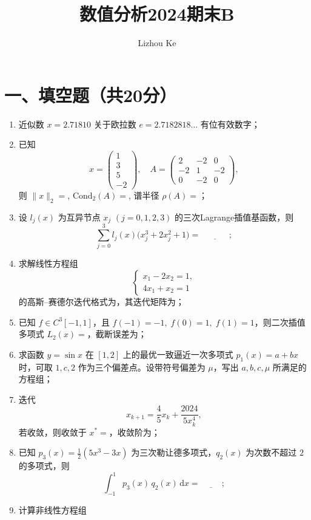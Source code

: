 \documentclass[12pt,a4paper]{article}
\title{数值分析2024期末B}
\author{Lizhou Ke}
\date{}
\newcommand{\blank}[1]{\underline{\hspace{#1}}}
\newcommand{\norm}[1]{\lVert#1\rVert_2}
\begin{document}
	
	\maketitle
	
	\section*{一、填空题（共20分）}
	\begin{enumerate}[leftmargin=*,itemsep=1.5ex]
		\item 近似数 $x=2.71810$ 关于欧拉数 $e=2.7182818\ldots$ 有\blank{20pt}位有效数字；
		\item 已知 
		\[
		x=\begin{pmatrix}1\\3\\5\\-2\end{pmatrix},\quad
		A=\begin{pmatrix}2&-2&0\\-2&1&-2\\0&-2&0\end{pmatrix},
		\]
		则 $\norm{x}=$\blank{20pt}, $\mathrm{Cond}_2(A)=$\blank{20pt}, 谱半径 $\rho(A)=$\blank{20pt}；
		\item 设 $l_j(x)$ 为互异节点 $x_j$ $(j=0,1,2,3)$ 的三次Lagrange插值基函数，则
		\[
		\sum_{j=0}^3 l_j(x)\bigl(x_j^3 + 2x_j^2 + 1\bigr)
		= \blank{40pt};
		\]
		\item 求解线性方程组
		\[
		\begin{cases}
			x_1 - 2x_2 = 1,\\
			4x_1 + x_2 = 1
		\end{cases}
		\]
		的高斯--赛德尔迭代格式为\blank{40pt}，其迭代矩阵为\blank{40pt}；
		\item 已知 $f\in C^3[-1,1]$，且 $f(-1)=-1,\;f(0)=1,\;f(1)=1$，则二次插值多项式 $L_2(x)=$\blank{40pt}，截断误差为\blank{40pt}；
		\item 求函数 $y=\sin x$ 在 $[1,2]$ 上的最优一致逼近一次多项式 $p_1(x)=a+bx$ 时，可取 $1,c,2$ 作为三个偏差点。设带符号偏差为 $\mu$，写出 $a,b,c,\mu$ 所满足的方程组\blank{60pt}；
		\item 迭代
		\[
		x_{k+1} = \frac{4}{5}x_k + \frac{2024}{5x_k^4},
		\]
		若收敛，则收敛于 $x^*=$\blank{20pt}，收敛阶为\blank{20pt}；
		\item 已知 $p_3(x)=\tfrac12(5x^3-3x)$ 为三次勒让德多项式，$q_2(x)$ 为次数不超过 $2$ 的多项式，则
		\[
		\int_{-1}^1 p_3(x)\,q_2(x)\,\mathrm{d}x
		= \blank{30pt};
		\]
		\item 计算非线性方程组

\end{enumerate}
\end{document}
